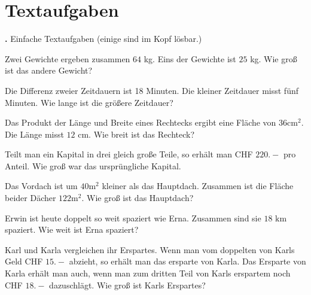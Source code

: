 \section{Textaufgaben}

\textbf{\bbwAufgabenNummer{}.}
Einfache Textaufgaben (einige sind im Kopf lösbar.)

\begin{bbwAufgabenBlock}
\item Zwei Gewichte ergeben zusammen $64$ kg. Eins der Gewichte ist
$25$ kg. Wie groß ist das andere Gewicht?


\item Die Differenz zweier Zeitdauern ist 18 Minuten. Die kleiner
Zeitdauer misst fünf Minuten. Wie lange ist die größere Zeitdauer?


\item Das Produkt der Länge und Breite eines Rechtecks ergibt eine
Fläche von $36 \text{cm}^2$. Die Länge misst $12$ cm. Wie breit ist
das Rechteck?



\item Teilt man ein Kapital in drei gleich große Teile, so erhält man
CHF $220.-$ pro Anteil. Wie groß war das ursprüngliche Kapital.


\item Das Vordach ist um $40 \text{m}^2$ kleiner als das
Hauptdach. Zusammen ist die Fläche beider Dächer $122 \text{m}^2$. Wie
groß ist das Hauptdach?

\noTRAINER{\newpage}

\item Erwin ist heute doppelt so weit spaziert wie Erna. Zusammen sind
sie $18 \text{ km}$ spaziert. Wie weit ist Erna spaziert?


\item Karl und Karla vergleichen ihr Erspartes. Wenn man vom doppelten
von Karls Geld CHF $15.-$ abzieht, so erhält man das ersparte von
Karla. Das Ersparte von Karla erhält man auch, wenn man zum dritten
Teil von Karls erspartem noch CHF $18.-$ dazuschlägt. Wie groß ist
Karls Erspartes?


\end{bbwAufgabenBlock}
